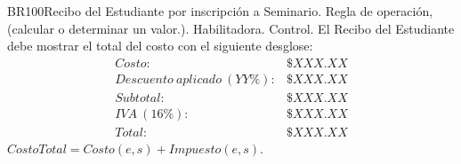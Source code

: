 \begin{BussinesRule}{BR100}{Recibo del Estudiante por inscripción a Seminario.}
	\BRitem[Tipo:] Regla de operación, (calcular o determinar un valor.).
	\BRitem[Clase:] Habilitadora. 
	\BRitem[Nivel:] Control. %
	\BRitem[Descripción:] El  Recibo del Estudiante debe mostrar el total del costo con el siguiente desglose:
		\begin{displaymath}\begin{array}{lr}
			Costo: & \$ XXX.XX\\
			Descuento~aplicado~(YY\%): & \$ XXX.XX\\
			Subtotal: & \$ XXX.XX\\
			IVA~(16\%): & \$ XXX.XX\\\hline
			Total: & \$ XXX.XX
		\end{array}\end{displaymath}
	\BRitem[Sentencia:] $CostoTotal = Costo(e, s) + Impuesto(e, s)$.
	
	
\end{BussinesRule}

